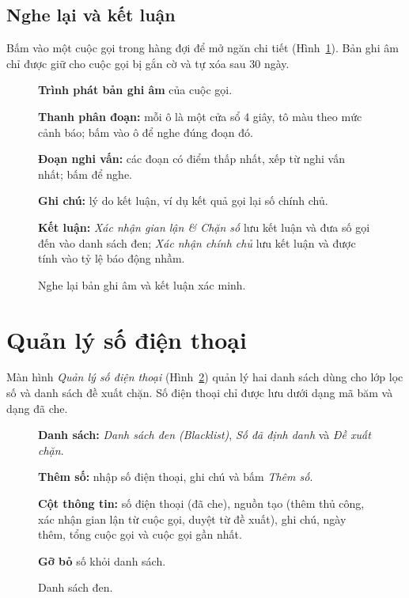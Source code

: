 \documentclass[11pt]{article}
\begin{document}
\subsection{Nghe lại và kết luận}

Bấm vào một cuộc gọi trong hàng đợi để mở ngăn chi tiết (Hình~\ref{fig:drawerreview}). Bản ghi âm chỉ được giữ cho cuộc gọi bị gắn cờ và tự xóa sau 30 ngày.

\begin{figure}[tbp]
  \centering
  \caption{Nghe lại bản ghi âm và kết luận xác minh.}
  \label{fig:drawerreview}
  \begin{flushleft}\small
\begin{legend}
  \item \textbf{Trình phát bản ghi âm} của cuộc gọi.
  \item \textbf{Thanh phân đoạn:} mỗi ô là một cửa sổ 4 giây, tô màu theo mức cảnh báo; bấm vào ô để nghe đúng đoạn đó.
  \item \textbf{Đoạn nghi vấn:} các đoạn có điểm thấp nhất, xếp từ nghi vấn nhất; bấm để nghe.
  \item \textbf{Ghi chú:} lý do kết luận, ví dụ kết quả gọi lại số chính chủ.
  \item \textbf{Kết luận:} \emph{Xác nhận gian lận \& Chặn số} lưu kết luận và đưa số gọi đến vào danh sách đen; \emph{Xác nhận chính chủ} lưu kết luận và được tính vào tỷ lệ báo động nhầm.
\end{legend}
  \end{flushleft}
\end{figure}

\section{Quản lý số điện thoại}

Màn hình \emph{Quản lý số điện thoại} (Hình~\ref{fig:numbers}) quản lý hai danh sách dùng cho lớp lọc số và danh sách đề xuất chặn. Số điện thoại chỉ được lưu dưới dạng mã băm và dạng đã che.

\begin{figure}[tbp]
  \centering
  \caption{Danh sách đen.}
  \label{fig:numbers}
  \begin{flushleft}\small
\begin{legend}
  \item \textbf{Danh sách:} \emph{Danh sách đen (Blacklist)}, \emph{Số đã định danh} và \emph{Đề xuất chặn}.
  \item \textbf{Thêm số:} nhập số điện thoại, ghi chú và bấm \emph{Thêm số}.
  \item \textbf{Cột thông tin:} số điện thoại (đã che), nguồn tạo (thêm thủ công, xác nhận gian lận từ cuộc gọi, duyệt từ đề xuất), ghi chú, ngày thêm, tổng cuộc gọi và cuộc gọi gần nhất.
  \item \textbf{Gỡ bỏ} số khỏi danh sách.
\end{legend}
  \end{flushleft}
\end{figure}
\end{document}
